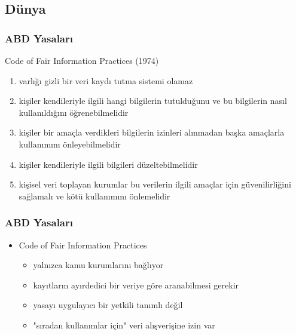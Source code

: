 \documentclass[dvipsnames]{beamer}
\theoremstyle{definition}
\theoremstyle{example}
\theoremstyle{plain}
\begin{document}
\subsection{Dünya}

\begin{frame}
  \frametitle{ABD Yasaları}

  \begin{block}{Code of Fair Information Practices (1974)}
    \begin{enumerate}
      \item varlığı gizli bir veri kaydı tutma sistemi olamaz

      \pause
      \item kişiler kendileriyle ilgili hangi bilgilerin tutulduğunu ve bu
        bilgilerin nasıl kullanıldığını öğrenebilmelidir

      \pause
      \item kişiler bir amaçla verdikleri bilgilerin izinleri alınmadan başka
        amaçlarla kullanımını önleyebilmelidir

      \pause
      \item kişiler kendileriyle ilgili bilgileri düzeltebilmelidir

      \pause
      \item kişisel veri toplayan kurumlar bu verilerin ilgili amaçlar için
        güvenilirliğini sağlamalı ve kötü kullanımını önlemelidir
    \end{enumerate}
  \end{block}
\end{frame}

\begin{frame}
  \frametitle{ABD Yasaları}

  \begin{itemize}
    \item Code of Fair Information Practices

    \begin{itemize}
      \item yalnızca kamu kurumlarını bağlıyor

      \pause
      \item kayıtların ayırdedici bir veriye göre aranabilmesi gerekir

      \pause
      \item yasayı uygulayıcı bir yetkili tanımlı değil

      \pause
      \item "sıradan kullanımlar için" veri alışverişine izin var
    \end{itemize}
  \end{itemize}
\end{frame}
\end{document}
